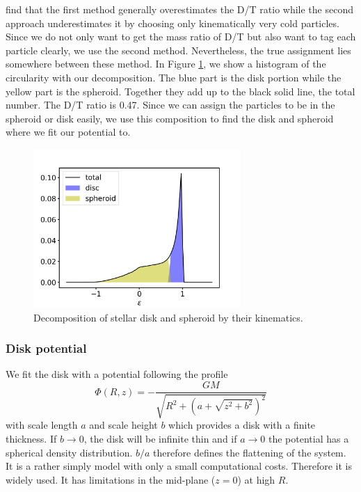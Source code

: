 \cite{AurigaGrand} find that the first method generally overestimates the \ac{D/T} ratio while the second approach underestimates it by choosing only kinematically very cold particles. Since we do not only want to get the mass ratio of \ac{D/T} but also want to tag each particle clearly, we use the second method. Nevertheless, the true assignment lies somewhere between these method. In Figure \ref{fig:decomposition}, we show a histogram of the circularity with our decomposition. The blue part is the disk portion while the yellow part is the spheroid. Together they add up to the black solid line, the total number. The \ac{D/T} ratio is 0.47.
Since we can assign the particles to be in the spheroid or disk easily, we use this composition to find the disk and spheroid where we fit our potential to. 

\begin{figure}
    \centering
    \includegraphics[width=0.7\textwidth]{plots/Auriga/decomposition_snap_127.png}
    \caption{Decomposition of stellar disk and spheroid by their kinematics. }
    \label{fig:decomposition}
\end{figure}
\subsubsection{Disk potential}\label{subsubsec:disk_pot}
We fit the disk with a \citet{MNprofile} potential following the profile 
\begin{equation}
\Phi(R,z) = -\frac{GM}{\sqrt{R^2+(a+\sqrt{z^2+b^2})^2}}
\end{equation} 
with scale length $a$ and scale height $b$ which provides a disk with a finite thickness. If $b\rightarrow 0$, the disk will be infinite thin and if $a \rightarrow 0$ the potential has a spherical density distribution. $b/a$ therefore defines the flattening of the system. It is a rather simply model with only a small computational costs. Therefore it is widely used. It has limitations in the mid-plane ($z=0$) at high $R$. 

